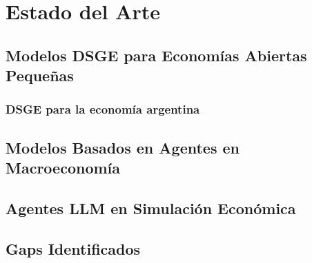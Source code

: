 
\chapter{Estado del Arte}
\label{chap:estado-del-arte}

\section{Modelos DSGE para Economías Abiertas Pequeñas}
\label{sec:soa-dsge}

\subsection{DSGE para la economía argentina}
\label{subsec:dsge-argentina}

\section{Modelos Basados en Agentes en Macroeconomía}
\label{sec:soa-abm}

\section{Agentes LLM en Simulación Económica}
\label{sec:soa-llm}

\section{Gaps Identificados}
\label{sec:gaps}
